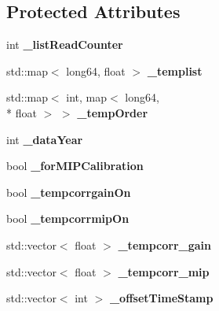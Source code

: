 \subsection*{Protected Attributes}
\begin{DoxyCompactItemize}
\item 
int {\bfseries \-\_\-list\-Read\-Counter}\label{classCALICE_1_1IntegratedScECALCalibrationProcessor_aa242bf8b17ea06ba0c3a29651ccf03c7}

\item 
std\-::map$<$ long64, float $>$ {\bfseries \-\_\-templist}\label{classCALICE_1_1IntegratedScECALCalibrationProcessor_ad97e4e34867d7fa28a1eb07ea6220af7}

\item 
std\-::map$<$ int, map$<$ long64, \\*
float $>$ $>$ {\bfseries \-\_\-temp\-Order}\label{classCALICE_1_1IntegratedScECALCalibrationProcessor_af562fe94a00b1e2a214d23dfc6046082}

\item 
int {\bfseries \-\_\-data\-Year}\label{classCALICE_1_1IntegratedScECALCalibrationProcessor_adabbfd2f9d989e06a31acf5df9404018}

\item 
bool {\bfseries \-\_\-for\-M\-I\-P\-Calibration}\label{classCALICE_1_1IntegratedScECALCalibrationProcessor_a5954f01e887988d58dfb4d0c449f671a}

\item 
bool {\bfseries \-\_\-tempcorrgain\-On}\label{classCALICE_1_1IntegratedScECALCalibrationProcessor_a5b2f5d0be9d2564c1f26136dc19c2812}

\item 
bool {\bfseries \-\_\-tempcorrmip\-On}\label{classCALICE_1_1IntegratedScECALCalibrationProcessor_a26685b20a13b1ec113ed710f5066f3da}

\item 
std\-::vector$<$ float $>$ {\bfseries \-\_\-tempcorr\-\_\-gain}\label{classCALICE_1_1IntegratedScECALCalibrationProcessor_a6bea424148f94a17f5b1bcaa9560b4f1}

\item 
std\-::vector$<$ float $>$ {\bfseries \-\_\-tempcorr\-\_\-mip}\label{classCALICE_1_1IntegratedScECALCalibrationProcessor_a96a833648299a5ac4ab5e961e5ce5425}

\item 
std\-::vector$<$ int $>$ {\bfseries \-\_\-offset\-Time\-Stamp}\label{classCALICE_1_1IntegratedScECALCalibrationProcessor_a8156f18fe252c98f723382db01ce9d80}


\end{DoxyCompactItemize}
